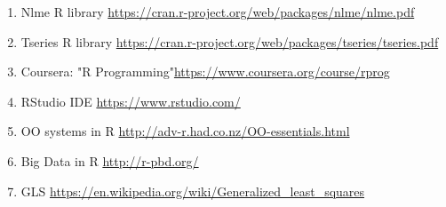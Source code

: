 \documentclass [twoside,
  11pt, a4paper,
  footinclude=true,
  headinclude=true,
  cleardoublepage=empty
]{article}
\begin{document}
\begin{enumerate}
    \item Nlme R library \url{https://cran.r-project.org/web/packages/nlme/nlme.pdf}
    \item Tseries R library \url{https://cran.r-project.org/web/packages/tseries/tseries.pdf}
    \item Coursera: "R Programming"\url{https://www.coursera.org/course/rprog}
    \item RStudio IDE \url{https://www.rstudio.com/}
    \item OO systems in R \url{http://adv-r.had.co.nz/OO-essentials.html}
    \item Big Data in R \url{http://r-pbd.org/}
    \item GLS \url{https://en.wikipedia.org/wiki/Generalized_least_squares}
\end{enumerate}
\end{document}
